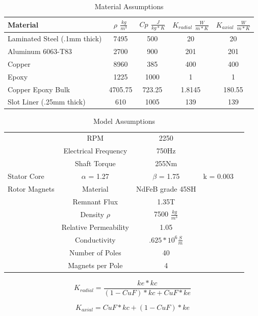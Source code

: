 \documentclass[]{aiaa-tc}%
\begin{document}
\begin{table}[hbt!]
\caption{\label{tab:COMSOL} Material Assumptions}
\centering
\begin{tabular}{lcccc}
\\
Material  & $\rho$ $\frac{kg}{m^3}$ & $Cp$ $\frac{J}{kg*K}$  & $K_{radial}$ $\frac{W}{m*K}$ & $K_{axial}$ $\frac{W}{m*K}$\\\hline
Laminated Steel (.1mm thick) & 7495& 500& 20& 20\\
Aluminum 6063-T83   & 2700  & 900 & 201& 201  \\
Copper & 8960 & 385 & 400& 400\\
Epoxy & 1225 & 1000 & 1& 1 \\
Copper Epoxy Bulk & 4705.75 & 723.25 & 1.8145 & 180.55\\
Slot Liner (.25mm thick) & 610 &1005&139 & 139\\\hline
\end{tabular}
\end{table}

\begin{table}[hbt!]
\caption{\label{tab:COMSOL2} Model Assumptions}
\centering
\begin{tabular}{lcccc}
\\\hline
& RPM & 2250\\
& Electrical Frequency & 750Hz\\
& Shaft Torque & 255Nm \\\hline
Stator Core & $\alpha$ = 1.27 & $\beta$ = 1.75 & k = 0.003 \\\hline
Rotor Magnets  & Material   & NdFeB grade 45SH  \\
& Remnant Flux & 1.35T\\
& Density $\rho$ & 7500 $\frac{kg}{m^3}$ \\
& Relative Permeability & 1.05\\
& Conductivity & $.625*10^6 \frac{S}{m}$\\
& Number of Poles & 40\\
& Magnets per Pole & 4\\\hline
\end{tabular}
\end{table}

\begin{equation}
K_{radial} = \frac{ke*kc}{(1-CuF)*kc + CuF*ke}
\label{eq:kradial}
\end{equation}

\begin{equation}
K_{axial} = CuF*kc + (1-CuF)*ke
\label{eq:kaxial}
\end{equation}
\end{document}
